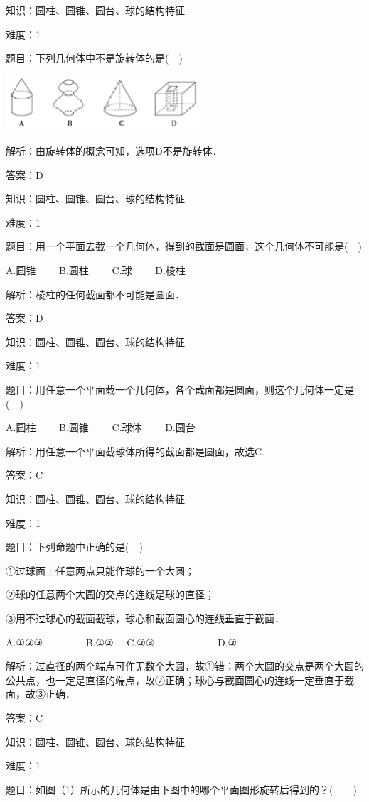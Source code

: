 \documentclass{article} %
\begin{document}
知识：圆柱、圆锥、圆台、球的结构特征

难度：1

题目：下列几何体中不是旋转体的是(　)

\includegraphics*[width=2.91in, height=0.82in, keepaspectratio=false]{image16}

解析：由旋转体的概念可知，选项D不是旋转体．

答案：D


知识：圆柱、圆锥、圆台、球的结构特征

难度：1

题目：用一个平面去截一个几何体，得到的截面是圆面，这个几何体不可能是(　)

A.圆锥　　 B.圆柱　　 C.球　　 D.棱柱

解析：棱柱的任何截面都不可能是圆面．

答案：D

知识：圆柱、圆锥、圆台、球的结构特征

难度：1

题目：用任意一个平面截一个几何体，各个截面都是圆面，则这个几何体一定是(　)

A.圆柱　　 B.圆锥　　 C.球体　　 D.圆台

解析：用任意一个平面截球体所得的截面都是圆面，故选C.

答案：C

知识：圆柱、圆锥、圆台、球的结构特征

难度：1

题目：下列命题中正确的是(　)

①过球面上任意两点只能作球的一个大圆；

②球的任意两个大圆的交点的连线是球的直径；

③用不过球心的截面截球，球心和截面圆心的连线垂直于截面．

A.①②③　　　　 B.①②　 C.②③　　　　　　 D.②

解析：过直径的两个端点可作无数个大圆，故①错；两个大圆的交点是两个大圆的公共点，也一定是直径的端点，故②正确；球心与截面圆心的连线一定垂直于截面，故③正确．

答案：C

知识：圆柱、圆锥、圆台、球的结构特征

难度：1

题目：如图（1）所示的几何体是由下图中的哪个平面图形旋转后得到的？(　　)
\end{document}
